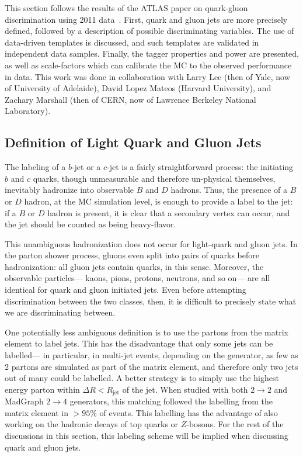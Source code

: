 This section follows the results of the ATLAS paper on quark-gluon discrimination using 2011 data~\cite{ATLASqg,Golling:1554107}. First, quark and gluon jets are more precisely defined, followed by a description of possible discriminating variables. The use of data-driven templates is discussed, and such templates are validated in independent data samples. Finally, the tagger properties and power are presented, as well as scale-factors which can calibrate the MC to the observed performance in data. This work was done in collaboration with Larry Lee (then of Yale, now of University of Adelaide), David Lopez Mateos (Harvard University), and Zachary Marshall (then of CERN, now of Lawrence Berkeley National Laboratory).

\subsection{Definition of Light Quark and Gluon Jets}
\label{jet-reconstruction:qg:definition}

The labeling of a $b$-jet or a $c$-jet is a fairly straightforward process: the initiating $b$ and $c$ quarks, though unmeasurable and therefore un-physical themselves, inevitably hadronize into observable $B$ and $D$ hadrons. Thus, the presence of a $B$ or $D$ hadron, at the MC simulation level, is enough to provide a label to the jet: if a $B$ or $D$ hadron is present, it is clear that a secondary vertex can occur, and the jet should be counted as being heavy-flavor.

This unambiguous hadronization does not occur for light-quark and gluon jets. In the parton shower process, gluons even split into pairs of quarks before hadronization: all gluon jets contain quarks, in this sense. Moreover, the observable particles--- kaons, pions, protons, neutrons, and so on--- are all identical for quark and gluon initiated jets. Even before attempting discrimination between the two classes, then, it is difficult to precisely state what we are discriminating between.

One potentially less ambiguous definition is to use the partons from the matrix element to label jets. This has the disadvantage that only some jets can be labelled--- in particular, in multi-jet events, depending on the generator, as few as 2 partons are simulated as part of the matrix element, and therefore only two jets out of many could be labelled. A better strategy is to simply use the highest energy parton within $\Delta R < R_\mathrm{jet}$ of the jet. When studied with both \Pythia $2\rightarrow2$ and MadGraph $2\rightarrow4$ generators, this matching followed the labelling from the matrix element in $> 95\%$ of events. This labelling has the advantage of also working on the hadronic decays of top quarks or $Z$-bosons. For the rest of the discussions in this section, this labeling scheme will be implied when discussing quark and gluon jets.

